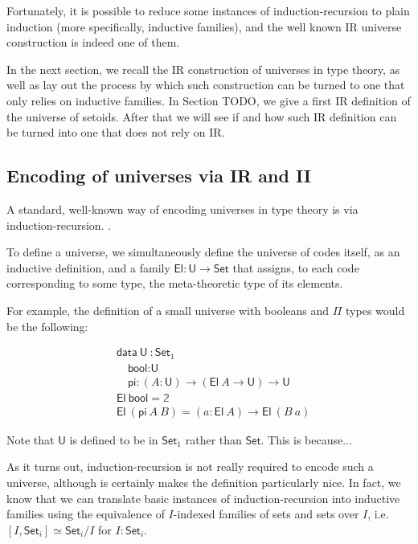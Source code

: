\documentclass{easychair}
\newcommand{\Set}{\textsf{Set}}
\newcommand{\U}{\textsf{U}}
\newcommand{\El}{\textsf{El}}
\providecommand\mathbbm{\mathbb}
\begin{document}
Fortunately, it is possible to reduce some instances of induction-recursion to
plain induction (more specifically, inductive families), and the well known IR
universe construction is indeed one of them.

In the next section, we recall the IR construction of universes in type theory,
as well as lay out the process by which such construction can be turned to one
that only relies on inductive families. In Section TODO, we give a first IR
definition of the universe of setoids. After that we will see if and how such IR
definition can be turned into one that does not rely on IR.

\subsection{Encoding of universes via IR and II}

A standard, well-known way of encoding universes in type theory is via induction-recursion.
.

To define a universe, we simultaneously define the universe of codes itself, as
an inductive definition, and a family $\El : \U \to \Set$ that assigns, to each
code corresponding to some type, the meta-theoretic type of its elements.

For example, the definition of a small universe with booleans and $\Pi$ types
would be the following:

\begin{align*}
  & \textsf{data}\ \U\ : \Set_1 \\
  & \quad \textsf{bool} : \U \\
  & \quad \textsf{pi} : (A : \U) \to (\El\ A \to \U) \to \U \\
  & \El\ \textsf{bool} = \mathbbm{2} \\
  & \El\ (\textsf{pi}\ A\ B) = (a : \El\ A) \to \El\ (B\ a)
\end{align*}

Note that $\U$ is defined to be in $\Set_1$ rather than $\Set$. This is
because... 

As it turns out, induction-recursion is not really required to encode such
a universe, although is certainly makes the definition particularly nice.
%
In fact, we know that we can translate basic instances of induction-recursion
into inductive families using the equivalence of $I$-indexed families of sets
and sets over $I$, i.e.\ $[I, \Set_i] \simeq \Set_i/I$ for $I : \Set_i$.
\end{document}
